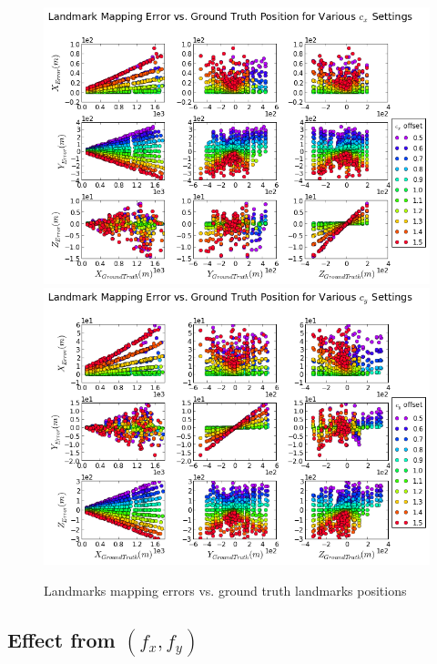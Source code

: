 \begin{figure}[h]
  \centering
  \includegraphics[width=13cm, keepaspectratio=true]{./Figures/SimulationFigures/Figure32.png}
  \includegraphics[width=13cm, keepaspectratio=true]{./Figures/SimulationFigures/Figure33.png}
  \caption{Landmarks mapping errors vs. ground truth landmarks positions}
  \label{fig:simfig32-33}
\end{figure}
\FloatBarrier

\subsection{Effect from $(f_x, f_y)$}

